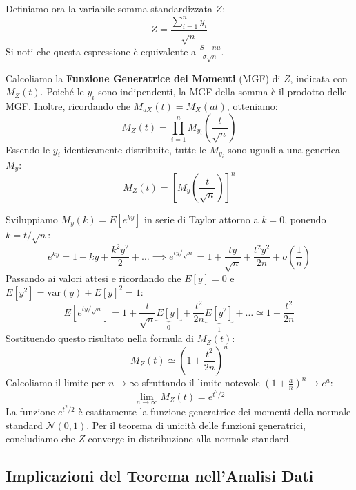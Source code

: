 \documentclass[openany,a4paper,12pt]{book}
\theoremstyle{remark}
\begin{document}
Definiamo ora la variabile somma standardizzata $Z$:
\[
Z = \frac{\sum_{i=1}^{n} y_i}{\sqrt{n}}
\]
Si noti che questa espressione è equivalente a $\frac{S - n\mu}{\sigma\sqrt{n}}$.

Calcoliamo la \textbf{Funzione Generatrice dei Momenti} (MGF) di $Z$, indicata con $M_Z(t)$.
Poiché le $y_i$ sono indipendenti, la MGF della somma è il prodotto delle MGF. Inoltre, ricordando che $M_{aX}(t) = M_X(at)$, otteniamo:
\begin{equation}
M_Z(t) = \prod_{i=1}^n M_{y_i}\left(\frac{t}{\sqrt{n}}\right)
\end{equation}
Essendo le $y_i$ identicamente distribuite, tutte le $M_{y_i}$ sono uguali a una generica $M_y$:
\begin{equation}
M_Z(t) = \left[ M_y\left(\frac{t}{\sqrt{n}}\right) \right]^n
\end{equation}

Sviluppiamo $M_y(k) = E[e^{ky}]$ in serie di Taylor attorno a $k=0$, ponendo $k = t/\sqrt{n}$:
\begin{equation}
e^{ky} = 1 + ky + \frac{k^2 y^2}{2} + \dots \implies e^{ty/\sqrt{n}} = 1 + \frac{ty}{\sqrt{n}} + \frac{t^2 y^2}{2n} + o\left(\frac{1}{n}\right)
\end{equation}
Passando ai valori attesi e ricordando che $E[y]=0$ e $E[y^2] = \text{var}(y) + E[y]^2 = 1$:
\begin{equation}
E\left[ e^{ty/\sqrt{n}} \right] = 1 + \frac{t}{\sqrt{n}}\underbrace{E[y]}_{0} + \frac{t^2}{2n}\underbrace{E[y^2]}_{1} + \dots \simeq 1 + \frac{t^2}{2n}
\end{equation}
Sostituendo questo risultato nella formula di $M_Z(t)$:
\begin{equation}
M_Z(t) \simeq \left( 1 + \frac{t^2}{2n} \right)^n
\end{equation}
Calcoliamo il limite per $n \to \infty$ sfruttando il limite notevole $(1 + \frac{a}{n})^n \to e^a$:
\begin{equation}
\lim_{n \to \infty} M_Z(t) = e^{t^2/2}
\end{equation}
La funzione $e^{t^2/2}$ è esattamente la funzione generatrice dei momenti della normale standard $\mathcal{N}(0,1)$. Per il teorema di unicità delle funzioni generatrici, concludiamo che $Z$ converge in distribuzione alla normale standard.





\subsection*{Implicazioni del Teorema nell'Analisi Dati}
\end{document}

